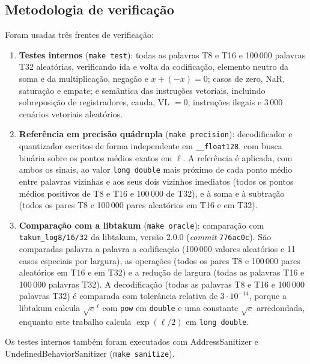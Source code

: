 \documentclass[journal]{IEEEtran}
\begin{document}
\subsection{Metodologia de verificação}
Foram usadas três frentes de verificação:
\begin{enumerate}
\item \textbf{Testes internos} (\texttt{make test}): todas as palavras T8
e T16 e 100\,000 palavras T32 aleatórias, verificando ida e volta da
codificação, elemento neutro da soma e da multiplicação, negação e
$x + (-x) = 0$; casos de zero, NaR, saturação e empate; e semântica das
instruções vetoriais, incluindo sobreposição de registradores, cauda,
VL $=0$, instruções ilegais e 3\,000 cenários vetoriais aleatórios.
\item \textbf{Referência em precisão quádrupla} (\texttt{make precision}):
decodificador e quantizador escritos de forma independente em
\texttt{\_\_float128}, com busca binária sobre os pontos médios exatos em
$\ell$. A referência é aplicada, com ambos os sinais, ao valor \texttt{long double}
mais próximo de cada ponto médio entre palavras vizinhas e aos seus dois
vizinhos imediatos (todos os pontos médios positivos de T8 e T16 e
100\,000 de T32), e à soma e à subtração (todos os pares T8 e 100\,000
pares aleatórios em T16 e em T32).
\item \textbf{Comparação com a libtakum} (\texttt{make oracle}): comparação
com \texttt{takum\_log8/16/32} da libtakum, versão 2.0.0 (\emph{commit}
\texttt{776ac0c}). São comparadas palavra a palavra a codificação
(100\,000 valores aleatórios e 11 casos especiais por largura), as
operações (todos os pares T8 e 100\,000 pares aleatórios em T16 e em T32)
e a redução de largura (todas as palavras T16 e 100\,000 palavras T32). A
decodificação (todas as palavras T8 e T16 e 100\,000 palavras T32) é
comparada com tolerância relativa de $3\cdot 10^{-14}$, porque a
libtakum calcula $\sqrt{e}^{\,\ell}$ com \texttt{pow} em \texttt{double} e
uma constante $\sqrt{e}$ arredondada, enquanto este trabalho calcula
$\exp(\ell/2)$ em \texttt{long double}.
\end{enumerate}
Os testes internos também foram executados com AddressSanitizer e
UndefinedBehaviorSanitizer (\texttt{make sanitize}).
\end{document}
